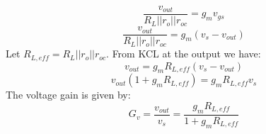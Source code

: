     \begin{equation}
        \frac{{{v_{out}}}}{{{R_L}||{r_o}||r_{oc}}} = {g_m}{v_{gs}}
    \end{equation}
    \begin{equation}
        \frac{{{v_{out}}}}{{{R_L}||{r_o}||r_{oc}}} = {g_m}\left( {{v_{s}} - {v_{out}}} \right)
    \end{equation}
Let $R_{L,eff} =  R_L || r_o || r_{oc}$.   From KCL at the output we have:
    \begin{equation}
        v_{out} = g_m R_{L,eff} (v_s - v_{out} )
    \end{equation}
    \begin{equation}
        v_{out} \left(1 + g_m R_{L,eff} \right) = g_m R_{L,eff} v_s
    \end{equation}
The voltage gain is given by:
    \begin{equation}
        G_v = \frac{v_{out}}{v_s} = \frac{ g_m R_{L,eff}}{ 1 + g_m R_{L,eff}}
    \end{equation}
